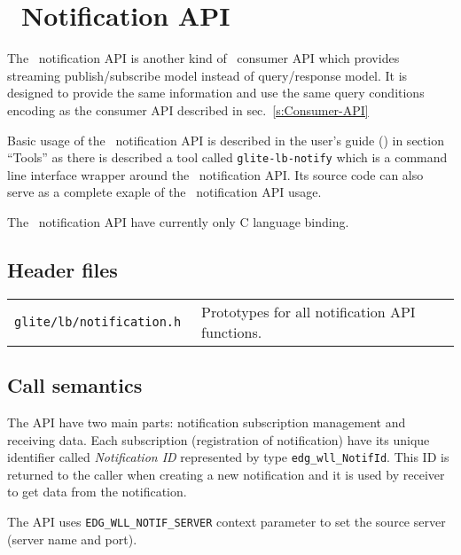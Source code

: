 
\section{\LB\ Notification API}
\label{s:Notification-API}


The \LB\ notification API is another kind of \LB\ consumer API which
provides streaming publish/subscribe model instead of query/response
model. It is designed to provide the same information and use the same
query conditions encoding as the consumer API described in
sec.~\ref{s:Consumer-API}

Basic usage of the \LB\ notification API is described in the \LB
user's guide (\cite{lbug}) in section ``Tools'' as there is described
a tool called \verb'glite-lb-notify' which is a command line interface
wrapper around the \LB\ notification API. Its source code can also
serve as a complete exaple of the \LB\ notification API usage.

The \LB\ notification API have currently only C language binding.

\subsection{Header files}
\begin{table}[h]
\begin{tabularx}{\textwidth}{>{\tt}lX}
glite/lb/notification.h & Prototypes for all notification API functions. \\
\end{tabularx}
\end{table}

\subsection{Call semantics}
The API have two main parts: notification subscription management and
receiving data. Each subscription (registration of notification) have
its unique identifier called \emph{Notification ID} represented by
type \verb'edg_wll_NotifId'. This ID is returned to the caller when
creating a new notification and it is used by receiver to get data
from the notification.

The API uses \verb'EDG_WLL_NOTIF_SERVER' context parameter to set the
source server (\LB server name and port). 

